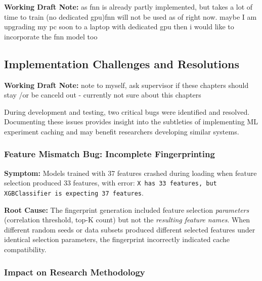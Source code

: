 \documentclass{imc-inf} %
\begin{document}
\begin{center}
\colorbox{yellow!20}{%
\begin{minipage}{0.9\textwidth}
\textbf{Working Draft Note:} 
as fnn is already partly implemented, but takes a lot of time to train (no dedicated gpu)fnn will not be used as of right now. maybe I am upgrading my pc soon to a laptop with dedicated gpu then i would like to incorporate the fnn model too
\end{minipage}
}
\end{center}


\subsection{Implementation Challenges and Resolutions}
\label{sec:implementation_challenges}


\begin{center}
\colorbox{yellow!20}{%
\begin{minipage}{0.9\textwidth}
\textbf{Working Draft Note:} 
note to myself, ask supervisor if these chapters should stay /or be canceld out - currently not sure about this chapters \end{minipage}
}
\end{center}

During development and testing, two critical bugs were identified and resolved. 
Documenting these issues provides insight into the subtleties of implementing 
ML experiment caching and may benefit researchers developing similar systems.

\subsubsection{Feature Mismatch Bug: Incomplete Fingerprinting}

\textbf{Symptom:} Models trained with 37 features crashed during loading when 
feature selection produced 33 features, with error: \texttt{X has 33 features, 
but XGBClassifier is expecting 37 features}.

\textbf{Root Cause:} The fingerprint generation included feature selection 
\textit{parameters} (correlation threshold, top-K count) but not the 
\textit{resulting feature names}. When different random seeds or data subsets 
produced different selected features under identical selection parameters, 
the fingerprint incorrectly indicated cache compatibility.

\subsubsection{Impact on Research Methodology}
\end{document}
